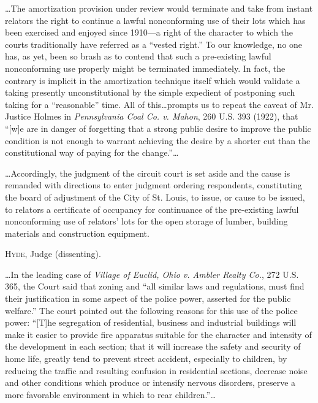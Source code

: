\ldots The amortization provision under review would terminate and take from
instant relators the right to continue a lawful nonconforming use of their lots
which has been exercised and enjoyed since 1910---a right of the character to
which the courts traditionally have referred as a ``vested right.'' To our
knowledge, no one has, as yet, been so brash as to contend that such a
pre-existing lawful nonconforming use properly might be terminated immediately.
In fact, the contrary is implicit in the amortization technique itself which
would validate a taking presently unconstitutional by the simple expedient of
postponing such taking for a ``reasonable'' time. All of this\ldots prompts us
to repeat the caveat of Mr. Justice Holmes in \emph{Pennsylvania Coal Co. v.
Mahon}, 260 U.S. 393 (1922), that ``[w]e are in danger of forgetting that a
strong public desire to improve the public condition is not enough to warrant
achieving the desire by a shorter cut than the constitutional way of paying for
the change.''\ldots

\ldots Accordingly, the judgment of the circuit court is set aside and the cause
is remanded with directions to enter judgment ordering respondents, constituting
the board of adjustment of the City of St. Louis, to issue, or cause to be
issued, to relators a certificate of occupancy for continuance of the
pre-existing lawful nonconforming use of relators' lots for the open storage of
lumber, building materials and construction equipment.

\opinion \textsc{Hyde}, Judge (dissenting).

\ldots In the leading case of \emph{Village of Euclid, Ohio v. Ambler Realty
Co.}, 272 U.S. 365, the Court said that zoning and ``all similar laws and
regulations, must find their justification in some aspect of the police power,
asserted for the public welfare.'' The court pointed out the following reasons
for this use of the police power: ``[T]he segregation of residential, business
and industrial buildings will make it easier to provide fire apparatus suitable
for the character and intensity of the development in each section; that it will
increase the safety and security of home life, greatly tend to prevent street
accident, especially to children, by reducing the traffic and resulting
confusion in residential sections, decrease noise and other conditions which
produce or intensify nervous disorders, preserve a more favorable environment in
which to rear children.''\ldots

